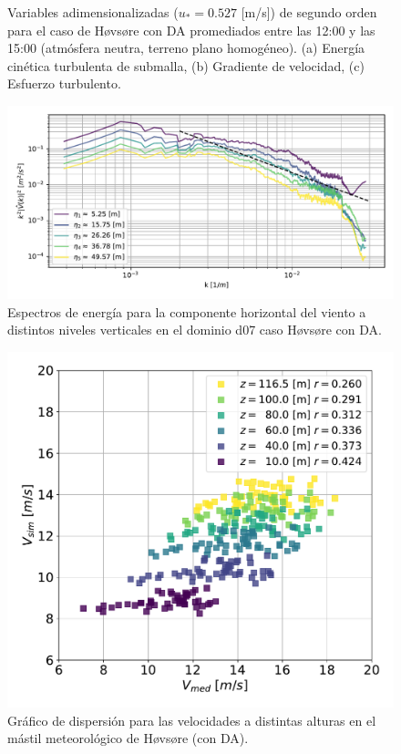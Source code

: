\begin{figure}[H]
\begin{center}
	\end{center}
	\caption{Variables adimensionalizadas ($u_* = 0.527$ [m/s]) de segundo orden para el caso de Høvsøre con DA promediados entre las 12:00 y las 15:00 (atmósfera neutra, terreno plano homogéneo). (a) Energía cinética turbulenta de submalla, (b) Gradiente de velocidad, (c) Esfuerzo turbulento. }
	\label{fig:06_hov_da_mean_secondorder}
\end{figure}

\begin{figure}[H]
	\centering
	\includegraphics[width=1.0\linewidth,page=1,trim={3mm 5mm 3mm 3mm},clip]{Imagenes/06/hov_da/spectra}%
	\caption{Espectros de energía para la componente horizontal del viento a distintos niveles verticales en el dominio d07 caso Høvsøre con DA.}
	\label{fig:06_hov_da_spectrum}
\end{figure}

\begin{figure}[H]
	\centering
	\includegraphics[width=0.55\linewidth,page=1,trim={0cm 0cm 0cm 0cm},clip]{Imagenes/06/hov_da/corr}%
	\caption{Gráfico de dispersión para las velocidades a distintas alturas en el mástil meteorológico de Høvsøre (con DA).}
	\label{fig:06_corr_hov_da}
\end{figure}

